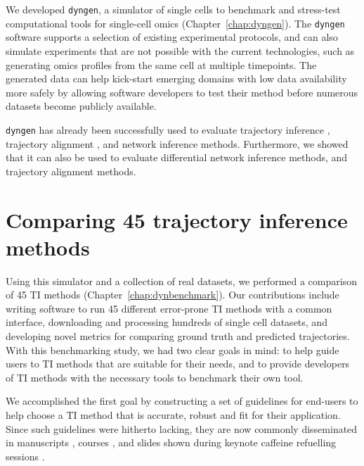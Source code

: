 We developed \texttt{dyngen}, a simulator of single cells to benchmark and stress-test computational tools for single-cell omics (Chapter~\ref{chap:dyngen}).
The \texttt{dyngen} software supports a selection of existing experimental protocols, and can also simulate experiments that are not possible with the current technologies, such as generating omics profiles from the same cell at multiple timepoints.
The generated data can help kick-start emerging domains with low data availability more safely by allowing software developers to test their method before numerous datasets become publicly available.

\texttt{dyngen} has already been successfully used to evaluate trajectory inference \cite{saelens_comparisonsinglecelltrajectory_2019}, trajectory alignment \cite{vandenberge_trajectorybaseddifferentialexpression_2019}, and network inference \cite{pratapa_benchmarkingalgorithmsgene_2019} methods. Furthermore, we showed that it can also be used to evaluate differential network inference methods, and trajectory alignment methods.




\section{Comparing 45 trajectory inference methods}
Using this simulator and a collection of real datasets, we performed a comparison of 45 TI methods (Chapter~\ref{chap:dynbenchmark}).
Our contributions include writing software to run 45 different error-prone TI methods with a common interface, downloading and processing hundreds of single cell datasets, and developing novel metrics for comparing ground truth and predicted trajectories.
With this benchmarking study, we had two clear goals in mind: to help guide users to TI methods that are suitable for their needs, and to provide developers of TI methods with the necessary tools to benchmark their own tool.

We accomplished the first goal by constructing a set of guidelines for end-users to help choose a TI method that is accurate, robust and fit for their application. 
Since such guidelines were hitherto lacking, they are now commonly disseminated in manuscripts \cite{lafzi_tutorialguidelinesexperimental_2018,luecken_currentbestpractices_2019}, courses \cite{kiselev_analysissinglecell_2019,martens_analysissinglecell_2019}, and slides shown during keynote caffeine refuelling sessions \cite{hemberg_coffeebreakanalysis_2019}. 

